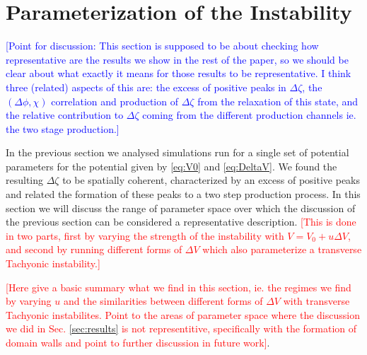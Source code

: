 
\section{Parameterization of the Instability} \label{sec:params}

\textcolor{blue}{[Point for discussion: This section is supposed to be about checking how representative are the results we show in the rest of the paper, so we should be clear about what exactly it means for those results to be representative. I think three (related) aspects of this are: the excess of positive peaks in $\Delta\zeta$, the $(\Delta\phi, \chi)$ correlation and production of $\Delta\zeta$ from the relaxation of this state, and the relative contribution to $\Delta\zeta$ coming from the different production channels ie. the two stage production.]}

In the previous section we analysed simulations run for a single set of potential parameters for the potential given by \eqref{eq:V0} and \eqref{eq:DeltaV}. We found the resulting $\Delta\zeta$ to be spatially coherent, characterized by an excess of positive peaks and related the formation of these peaks to a two step production process. In this section we will discuss the range of parameter space over which the discussion of the previous section can be considered a representative description. \textcolor{red}{[This is done in two parts, first by varying the strength of the instability with $V=V_0 + u\Delta V$, and second by running different forms of $\Delta V$ which also parameterize a transverse Tachyonic instability.]}

\textcolor{red}{[Here give a basic summary what we find in this section, ie. the regimes we find by varying $u$ and the similarities between different forms of $\Delta V$ with transverse Tachyonic instabilites. Point to the areas of parameter space where the discussion we did in Sec. \ref{sec:results} is not representitive, specifically with the formation of domain walls and point to further discussion in future work]}.



